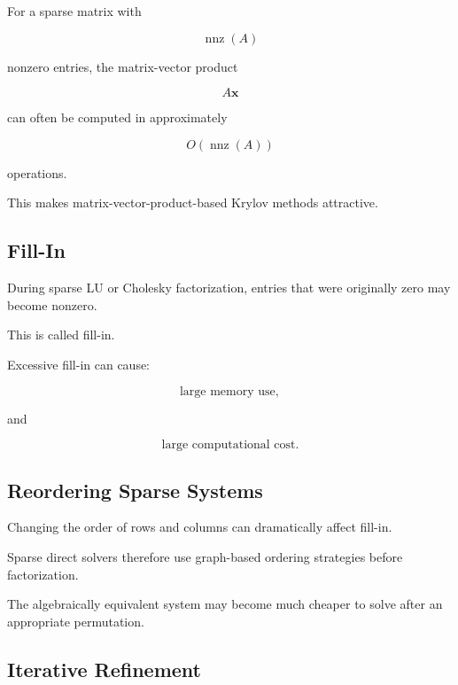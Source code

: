 For a sparse matrix with

\[
\operatorname{nnz}(A)
\]

nonzero entries, the matrix-vector product

\[
A\mathbf{x}
\]

can often be computed in approximately

\[
\boxed{
O
(
\operatorname{nnz}(A)
)
}
\]

operations.

This makes matrix-vector-product-based Krylov methods attractive.

\subsection{Fill-In}
\label{subsec:fill-in}

During sparse LU or Cholesky factorization, entries that were originally
zero may become nonzero.

This is called fill-in.

Excessive fill-in can cause:

\[
\boxed{
\text{large memory use},
}
\]

and

\[
\boxed{
\text{large computational cost}.
}
\]

\subsection{Reordering Sparse Systems}
\label{subsec:sparse-reordering}

Changing the order of rows and columns can dramatically affect fill-in.

Sparse direct solvers therefore use graph-based ordering strategies before
factorization.

The algebraically equivalent system may become much cheaper to solve after
an appropriate permutation.

\subsection{Iterative Refinement}
\label{subsec:iterative-refinement}


